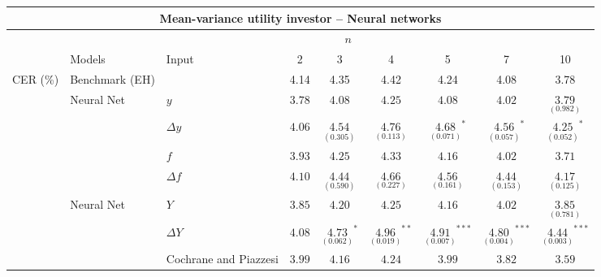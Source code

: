 \begin{tabular}{lllcccccc}
    \hline
	\multicolumn{9}{c}{Mean-variance utility investor -- Neural networks}\\\hline
	&& \multicolumn{6}{c}{$n$}\\\cline{4-9}
&Models&Input   & 2  & 3      & 4       & 5       & 7 & 10 \\
\hline
CER (\%) & Benchmark (EH) &  & 4.14 & 4.35 & 4.42 & 4.24 & 4.08 & 3.78 \\
    \cline{2-9}
 & Neural Net & $y$ & $3.78$ & $4.08$ & $4.25$ & $4.08$ & $4.02$ & \hspace{0.2cm} $\underset{(0.982)}{3.79}^{}$ \\
 &  & $\Delta y$ & $4.06$ & \hspace{0.2cm} $\underset{(0.305)}{4.54}^{}$ & \hspace{0.2cm} $\underset{(0.113)}{4.76}^{}$ & \hspace{0.2cm} $\underset{(0.071)}{4.68}^{*}$ & \hspace{0.2cm} $\underset{(0.057)}{4.56}^{*}$ & \hspace{0.2cm} $\underset{(0.052)}{4.25}^{*}$ \\
 &  & $f$ & $3.93$ & $4.25$ & $4.33$ & $4.16$ & $4.02$ & $3.71$ \\
 &  & $\Delta f$ & $4.10$ & \hspace{0.2cm} $\underset{(0.590)}{4.44}^{}$ & \hspace{0.2cm} $\underset{(0.227)}{4.66}^{}$ & \hspace{0.2cm} $\underset{(0.161)}{4.56}^{}$ & \hspace{0.2cm} $\underset{(0.153)}{4.44}^{}$ & \hspace{0.2cm} $\underset{(0.125)}{4.17}^{}$ \\
    \cline{2-9}
 & Neural Net & $Y$ & $3.85$ & $4.20$ & $4.25$ & $4.16$ & $4.02$ & \hspace{0.2cm} $\underset{(0.781)}{3.85}^{}$ \\
 &  & $\Delta Y$ & $4.08$ & \hspace{0.2cm} $\underset{(0.062)}{4.73}^{*}$ & \hspace{0.2cm} $\underset{(0.019)}{4.96}^{**}$ & \hspace{0.2cm} $\underset{(0.007)}{4.91}^{***}$ & \hspace{0.2cm} $\underset{(0.004)}{4.80}^{***}$ & \hspace{0.2cm} $\underset{(0.003)}{4.44}^{***}$ \\
 &  & Cochrane and Piazzesi & $3.99$ & $4.16$ & $4.24$ & $3.99$ & $3.82$ & $3.59$ \\

\end{tabular}
